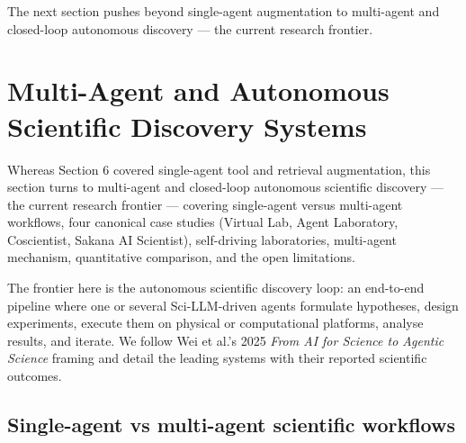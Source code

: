 \documentclass{article}
\begin{document}
The next section pushes beyond single-agent augmentation to multi-agent and closed-loop autonomous discovery --- the current research frontier.

\section{Multi-Agent and Autonomous Scientific Discovery Systems}\label{multi-agent-and-autonomous-scientific-discovery-systems}

Whereas Section 6 covered single-agent tool and retrieval augmentation, this section turns to multi-agent and closed-loop autonomous scientific discovery --- the current research frontier --- covering single-agent versus multi-agent workflows, four canonical case studies (Virtual Lab, Agent Laboratory, Coscientist, Sakana AI Scientist), self-driving laboratories, multi-agent mechanism, quantitative comparison, and the open limitations.

The frontier here is the autonomous scientific discovery loop: an end-to-end pipeline where one or several Sci-LLM-driven agents formulate hypotheses, design experiments, execute them on physical or computational platforms, analyse results, and iterate. We follow Wei et al.'s 2025 \emph{From AI for Science to Agentic Science} framing \cite{wei2025fromaiforscienceto} and detail the leading systems with their reported scientific outcomes.

\subsection{Single-agent vs multi-agent scientific workflows}\label{single-agent-vs-multi-agent-scientific-workflows}
\end{document}
